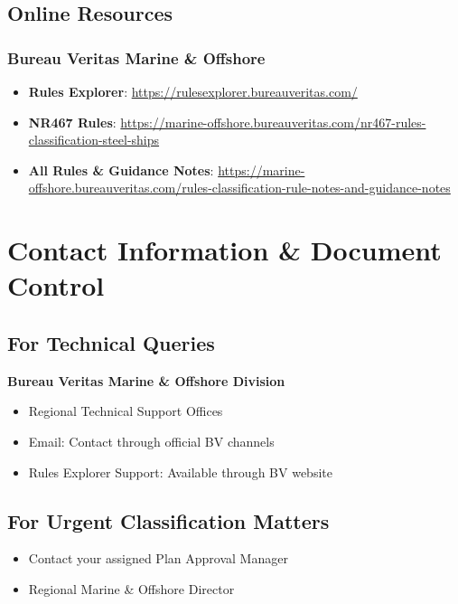 \documentclass[11pt,a4paper]{report}
\begin{document}
\section{Online Resources}

\subsection{Bureau Veritas Marine \& Offshore}
\begin{itemize}[leftmargin=*]
\item \textbf{Rules Explorer}: \url{https://rulesexplorer.bureauveritas.com/}
\item \textbf{NR467 Rules}: \url{https://marine-offshore.bureauveritas.com/nr467-rules-classification-steel-ships}
\item \textbf{All Rules \& Guidance Notes}: \url{https://marine-offshore.bureauveritas.com/rules-classification-rule-notes-and-guidance-notes}
\end{itemize}

\newpage

\chapter{Contact Information \& Document Control}
\label{ch:contact}

\section{For Technical Queries}

\textbf{Bureau Veritas Marine \& Offshore Division}
\begin{itemize}[leftmargin=*]
\item Regional Technical Support Offices
\item Email: Contact through official BV channels
\item Rules Explorer Support: Available through BV website
\end{itemize}

\section{For Urgent Classification Matters}

\begin{itemize}[leftmargin=*]
\item Contact your assigned Plan Approval Manager
\item Regional Marine \& Offshore Director
\end{itemize}
\end{document}
